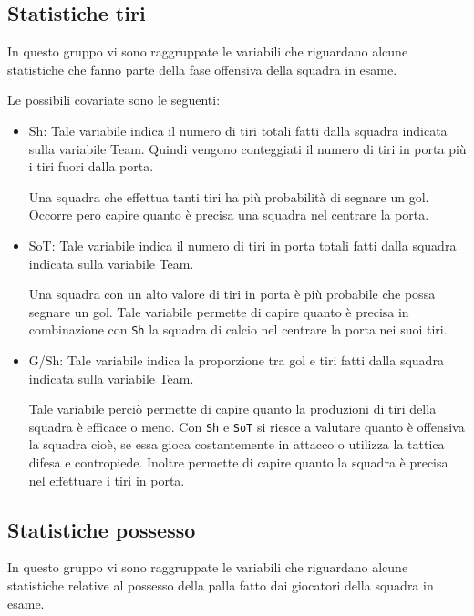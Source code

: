 \subsection{Statistiche tiri}

In questo gruppo vi sono raggruppate le variabili che riguardano alcune statistiche che fanno parte della fase offensiva della squadra in esame.

Le possibili covariate sono le seguenti:
\begin{itemize}
	
	\item \textsf{Sh}: Tale variabile indica il numero di tiri totali fatti dalla squadra indicata sulla variabile \textsf{Team}. Quindi vengono conteggiati il numero di tiri in porta più i tiri fuori dalla porta. 
	
	Una squadra che effettua tanti tiri ha più probabilità di segnare un gol. Occorre pero capire quanto è precisa una squadra nel centrare la porta.
	\item \textsf{SoT}: Tale variabile indica il numero di tiri in porta totali fatti dalla squadra indicata sulla variabile \textsf{Team}. 
	
	Una squadra con un alto valore di tiri in porta è più probabile che possa segnare un gol. Tale variabile permette di capire quanto è precisa in combinazione con \texttt{Sh} la squadra di calcio nel centrare la porta nei suoi tiri.
	\item \textsf{G/Sh}: Tale variabile indica la proporzione tra gol e tiri fatti dalla squadra indicata sulla variabile \textsf{Team}. 
	
	Tale variabile perciò permette di capire quanto la produzioni di tiri della squadra è efficace o meno. Con \texttt{Sh} e \texttt{SoT} si riesce a valutare quanto è offensiva la squadra cioè, se essa gioca costantemente in attacco o utilizza la tattica difesa e contropiede. Inoltre permette di capire quanto la squadra è precisa nel effettuare i tiri in porta.
\end{itemize}

\subsection{Statistiche possesso}

In questo gruppo vi sono raggruppate le variabili che riguardano alcune statistiche relative al possesso della palla fatto dai giocatori della squadra in esame.

